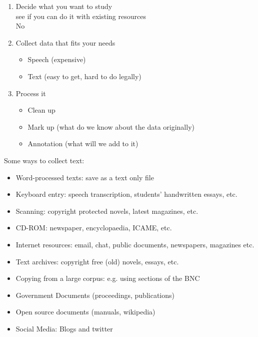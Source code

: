 \documentclass[a4paper,landscape,headrule,footrule,xetex]{foils}
\begin{document}

\begin{enumerate}
\item Decide what you want to study
\\ see if you can do it with existing resources
\\ No \frownie
\item Collect data that fits your needs
  \begin{itemize}
  \item Speech (expensive)
  \item Text (easy to get, hard to do legally)
  \end{itemize}
\item Process it
  \begin{itemize}
  \item Clean up
  \item Mark up (what do we know about the data originally)
  \item Annotation (what will we add to it)
  \end{itemize}
\end{enumerate}


Some ways to collect text:

\begin{itemize}\addtolength{\itemsep}{-1ex}
\item Word-processed texts: save as a text only file
\item Keyboard entry: speech transcription, students' handwritten essays, etc.
\item Scanning: copyright protected novels, latest magazines, etc.
\item CD-ROM: newspaper, encyclopaedia, ICAME, etc.
\item Internet resources: email, chat, public documents, newspapers, magazines etc.
\item  Text archives: copyright free (old) novels, essays, etc.
\item Copying from a large corpus: e.g. using sections of the BNC
\end{itemize}

\begin{itemize}
\item Government Documents (proceedings, publications)
\item Open source documents (manuals, wikipedia)
\item Social Media:  Blogs and twitter
\end{itemize}
\end{document}
